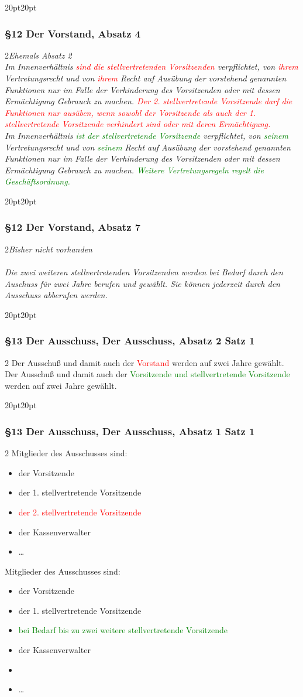 \documentclass[10pt,a4paper,parskip=half]{scrartcl}
\newcommand{\new}[1]{\textcolor{Green}{#1}}
\newcommand{\old}[1]{\textcolor{Red}{#1}}
\newcommand{\change}[1]{
  \begin{adjustwidth}{20pt}{20pt}
    #1
  \end{adjustwidth}
}
\newcommand{\compare}[3]{\change{\subsubsection*{#1}\begin{multicols}{2}#2\columnbreak\\#3\end{multicols}}}
\begin{document}
\compare{§12 Der Vorstand, Absatz 4}
{\em Ehemals Absatz 2\em\\
  Im Innenverhältnis \old{sind die stellvertretenden Vorsitzenden} verpflichtet,
  von \old{ihrem} Vertretungsrecht und von \old{ihrem} Recht auf Ausübung der vorstehend genannten Funktionen nur im Falle der Verhinderung des Vorsitzenden oder mit dessen Ermächtigung Gebrauch zu machen.
  \old{Der 2. stellvertretende Vorsitzende darf die Funktionen nur ausüben,
    wenn sowohl der
    Vorsitzende als auch der 1. stellvertretende Vorsitzende verhindert sind oder mit deren Ermächtigung.}
}
{Im Innenverhältnis \new{ist der stellvertretende Vorsitzende} verpflichtet,
  von \new{seinem} Vertretungsrecht und von \new{seinem} Recht auf Ausübung der vorstehend genannten Funktionen nur im Falle der Verhinderung des Vorsitzenden oder mit dessen Ermächtigung Gebrauch zu machen. \new{Weitere Vertretungsregeln regelt die Geschäftsordnung.}}

\compare{§12 Der Vorstand, Absatz 7}
{\em Bisher nicht vorhanden\em\\}
{Die zwei weiteren stellvertretenden Vorsitzenden werden bei Bedarf durch den Auschuss für zwei Jahre berufen und gewählt. Sie können jederzeit durch den Ausschuss abberufen werden.}

\compare{§13 Der Ausschuss, Der Ausschuss, Absatz 2 Satz 1}{
  Der Ausschuß und damit auch der \old{Vorstand} werden auf zwei Jahre gewählt.
}{
  Der Ausschuß und damit auch der \new{Vorsitzende und stellvertretende Vorsitzende} werden auf zwei Jahre gewählt.
}

\clearpage
\change{
  \subsubsection*{§13 Der Ausschuss, Der Ausschuss, Absatz 1 Satz 1}
  \begin{multicols}{2}
    Mitglieder des Ausschusses sind:
    \begin{itemize}[noitemsep]
      \item der Vorsitzende
      \item der 1. stellvertretende Vorsitzende
      \item \old{der 2. stellvertretende Vorsitzende}
      \item der Kassenverwalter
      \item \dots
    \end{itemize}
    \columnbreak
    Mitglieder des Ausschusses sind:
    \begin{itemize}[noitemsep]
      \item der Vorsitzende
      \item der 1. stellvertretende Vorsitzende
      \item \new{bei Bedarf bis zu zwei weitere stellvertretende Vorsitzende}
      \item der Kassenverwalter
      \item \item \dots
    \end{itemize}
  \end{multicols}
}
\end{document}
